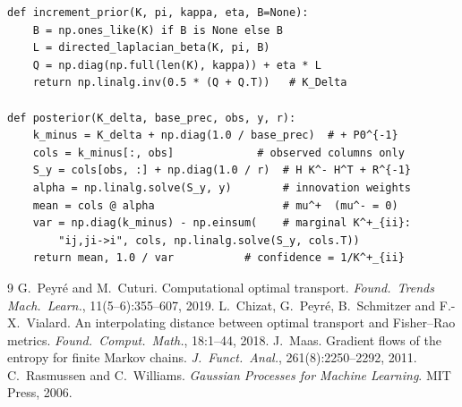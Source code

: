 \documentclass[11pt]{article}
\begin{document}
\begin{lstlisting}[caption={Increment prior and covariance-form update
(distilled from \texttt{graph/\{prior,posterior\}.py}).}]
def increment_prior(K, pi, kappa, eta, B=None):
    B = np.ones_like(K) if B is None else B
    L = directed_laplacian_beta(K, pi, B)
    Q = np.diag(np.full(len(K), kappa)) + eta * L
    return np.linalg.inv(0.5 * (Q + Q.T))   # K_Delta

def posterior(K_delta, base_prec, obs, y, r):
    k_minus = K_delta + np.diag(1.0 / base_prec)  # + P0^{-1}
    cols = k_minus[:, obs]             # observed columns only
    S_y = cols[obs, :] + np.diag(1.0 / r)  # H K^- H^T + R^{-1}
    alpha = np.linalg.solve(S_y, y)        # innovation weights
    mean = cols @ alpha                    # mu^+  (mu^- = 0)
    var = np.diag(k_minus) - np.einsum(    # marginal K^+_{ii}:
        "ij,ji->i", cols, np.linalg.solve(S_y, cols.T))
    return mean, 1.0 / var           # confidence = 1/K^+_{ii}
\end{lstlisting}

\begin{thebibliography}{9}
 G.~Peyr\'e and M.~Cuturi. Computational optimal transport.
\emph{Found.\ Trends Mach.\ Learn.}, 11(5--6):355--607, 2019.
 L.~Chizat, G.~Peyr\'e, B.~Schmitzer and F.-X.~Vialard. An
interpolating distance between optimal transport and Fisher--Rao metrics.
\emph{Found.\ Comput.\ Math.}, 18:1--44, 2018.
 J.~Maas. Gradient flows of the entropy for finite Markov
chains. \emph{J.\ Funct.\ Anal.}, 261(8):2250--2292, 2011.
 C.~Rasmussen and C.~Williams. \emph{Gaussian
Processes for Machine Learning}. MIT Press, 2006.
\end{thebibliography}
\end{document}
